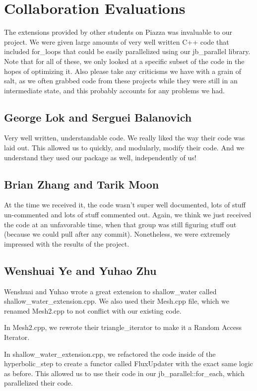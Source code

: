 \documentclass{article}
\begin{document}
\section{Collaboration Evaluations}

The extensions provided by other students on Piazza was invaluable to our project. We were given large amounts of very well written C++ code that included for\_loops that could be easily parallelized using our jb\_parallel library.  Note that for all of these, we only looked at a specific subset of the code in the hopes of optimizing it.  Also please take any criticisms we have with a grain of salt, as we often grabbed code from these projects while they were still in an intermediate state, and this probably accounts for any problems we had.


\subsection{George Lok and Serguei Balanovich}

Very well written, understandable code.  We really liked the way their code was laid out.  This allowed us to quickly, and modularly, modify their code.  And we understand they used our package as well, independently of us!

\subsection{Brian Zhang and Tarik Moon}

At the time we received it, the code wasn't super well documented, lots of stuff un-commented and lots of stuff commented out.  Again, we think we just received the code at an unfavorable time, when that group was still figuring stuff out (because we could pull after any commit).  Nonetheless, we were extremely impressed with the results of the project.

\subsection{Wenshuai Ye and Yuhao Zhu}

Wenshuai and Yuhao wrote a great extension to shallow\_water called shallow\_water\_extension.cpp. We also used their Mesh.cpp file, which we renamed Mesh2.cpp to not conflict with our existing code. 

In Mesh2.cpp, we rewrote their triangle\_iterator to make it a Random Access Iterator.

In shallow\_water\_extension.cpp, we refactored the code inside of the hyperbolic\_step to create a functor called FluxUpdater with the exact same logic as before. This allowed us to use their code in our jb\_parallel::for\_each, which parallelized their code.

\end{document}
